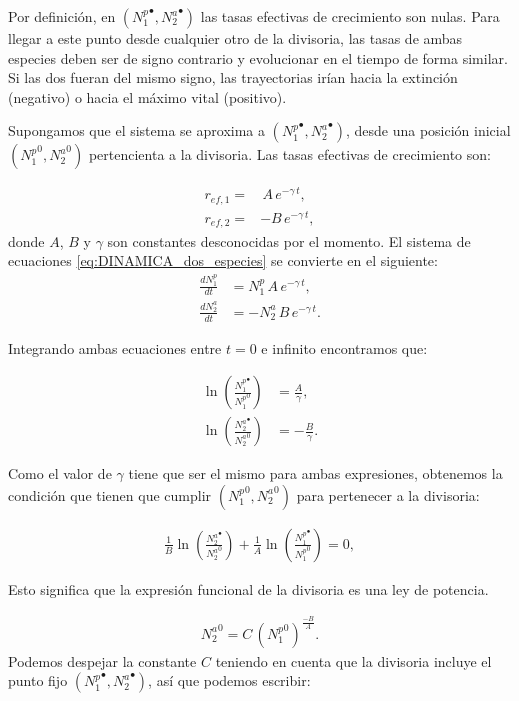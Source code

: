 Por definición, en $({N_1^p}^\bullet,{N_2^a}^\bullet)$ las tasas efectivas de crecimiento son nulas. Para llegar a este punto desde cualquier otro de la divisoria, las tasas de ambas especies deben ser de signo contrario y evolucionar en el tiempo de forma similar. Si las dos fueran del mismo signo, las trayectorias irían hacia la extinción (negativo) o hacia el máximo vital (positivo). 

Supongamos que el sistema se aproxima a $({N_1^p}^\bullet,{N_2^a}^\bullet)$, desde una posición inicial $({N_1^p}^0,{N_2^a}^0)$ pertencienta a la divisoria. Las tasas efectivas de crecimiento son:

\begin{align}
r_{ef,1}  = & \, A \, e^{-\gamma\, t} ,\nonumber\\  
r_{ef,2}  = & -B\, e^{-\gamma\, t} , 
\label{eq:coeffsreffs}
\end{align}
donde $A$, $B$ y $\gamma$ son constantes desconocidas por el momento. El sistema de ecuaciones \ref{eq:DINAMICA_dos_especies} se convierte en el siguiente:
\begin{align}
\frac{dN^p_{1}}{dt} & = N^p_{1} \, A \, e^{-\gamma \, t} , \nonumber \\
\frac{dN^a_{2}}{dt} & = -N^a_{2}\, B \, e^{-\gamma \, t} .
\label{eq:coeffsreffs_2}
\end{align}

Integrando ambas ecuaciones entre $t = 0$ e infinito  encontramos que:

\begin{align}
 \ln \left(\frac{{N_1^p}^\bullet}{{N_{1}^p}^0} \right) & = \frac{A}{\gamma} , \nonumber\\ 
 \ln \left(\frac{{N_2^a}^\bullet}{{N_{2}^a}^0} \right) & = - \frac{B}{\gamma} .
\label{eq:coeffsreffs_3}
\end{align}

Como el valor de $\gamma$ tiene que ser el mismo para ambas expresiones, obtenemos la condición que tienen que cumplir $({N_1^p}^0,{N_2^a}^0)$ para pertenecer a la divisoria:

\begin{align}
\frac{1}{B} \ln \left(\frac{{N_{2}^a}^\bullet}{{N_{2}^a}^0} \right) + \frac{1}{A} \ln \left(\frac{{N_1^p}^\bullet}{{N_1^p}^0} \right) = 0 ,
\label{eq:coeffsreffs_4}
\end{align}

Esto significa que la expresión funcional de la divisoria es una ley de potencia.

\begin{align}
{N_2^a}^0 = C\, ({N_1^p}^0)^\frac{-B}{A}. 
\label{eq:powerlaw}
\end{align}
Podemos despejar la constante $C$ teniendo en cuenta que la divisoria incluye el punto fijo $({N_1^p}^\bullet,{N_2^a}^\bullet)$, así que podemos escribir:

